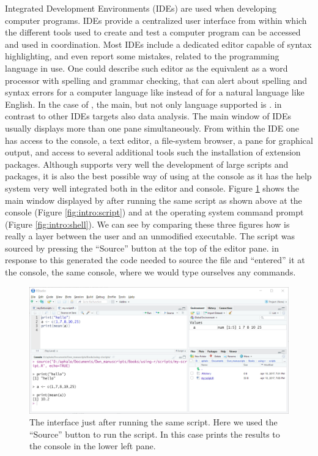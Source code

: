 \documentclass[krantz2]{krantz}\usepackage{knitr}%
\begin{document}
Integrated Development Environments (IDEs) are used when developing computer programs. IDEs provide a centralized user interface from within which the different tools used to create and test a computer program can be accessed and used in coordination. Most IDEs include a dedicated editor capable of syntax highlighting, and even report some mistakes, related to the programming language in use. One could describe such editor as the equivalent as a word processor with spelling and grammar checking, that can alert about spelling and syntax errors for a computer language like \Rlang instead of for a natural language like English. In the case of \RStudio, the main, but not only language supported is \Rlang. \RStudio in contrast to other IDEs targets also data analysis. The main window of IDEs usually displays more than one pane simultaneously. From within the \RStudio IDE one has access to the \Rpgrm console, a text editor, a file-system browser, a pane for graphical output, and access to several additional tools such the installation of extension packages. Although \RStudio supports very well the development of large scripts and packages, it is also the best possible way of using \Rpgrm at the console as it has the \Rpgrm help system very well integrated both in the editor and \Rlang console. Figure \ref{fig:intro:rstudio} shows the main window displayed by \RStudio after running the same script as shown above at the \Rpgrm console (Figure \ref{fig:intro:script}) and at the operating system command prompt (Figure \ref{fig:intro:shell}). We can see by comparing these three figures how \RStudio is really a layer between the user and an unmodified \Rpgrm executable. The script was sourced by pressing the ``Source'' button at the top of the editor pane. \RStudio in response to this generated the code needed to source the file and ``entered'' it at the console, the same console, where we would type ourselves any \Rpgrm commands.

\begin{figure}
  \centering
  \includegraphics[width=\linewidth]{figures/Rstudio-script}
  \caption[Script in Rstudio]{The \RStudio interface just after running the same script. Here we used the ``Source'' button to run the script. In this case \Rpgrm prints the results to the \Rpgrm console in the lower left pane.}\label{fig:intro:rstudio}
\end{figure}
\end{document}
